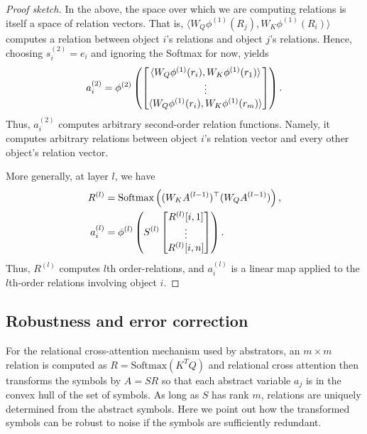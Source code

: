 \begin{proof}[Proof sketch]
	In the above, the space over which we are computing relations is itself a space of relation vectors. That is, \(\langle W_Q \phi^{(1)}(R_j), W_K \phi^{(1)}(R_i) \rangle\) computes a relation between object \(i\)'s relations and object \(j\)'s relations. Hence, choosing \(s_i^{(2)} = e_i\) and ignoring the Softmax for now, yields
	\begin{equation*}
		a_i^{(2)} = \phi^{(2)}\left(\begin{bmatrix}\langle W_Q \phi^{(1)}(r_i), W_K \phi^{(1)}(r_1) \rangle \\ \vdots \\ \langle W_Q \phi^{(1)}(r_i), W_K \phi^{(1)}(r_\m) \rangle\end{bmatrix}\right).
	\end{equation*}
	Thus, \(a_i^{(2)}\) computes arbitrary second-order relation functions. Namely, it computes arbitrary relations between object \(i\)'s relation vector and every other object's relation vector.

	More generally, at layer \(l\), we have
	\begin{align*}
		R^{(l)} &= \Softmax\left((W_K A^{(l-1)})^\top (W_Q A^{(l-1)})\right),\\
		a_i^{(l)} &= \phi^{(l)}\left(S^{(l)} \begin{bmatrix}R^{(l)}[i,1] \\ \vdots \\ R^{(l)}[i,n]\end{bmatrix}\right).
	\end{align*}
	Thus, \(R^{(l)}\) computes \(l\)th order-relations, and \(a_i^{(l)}\) is a linear map applied to the \(l\)th-order relations involving object \(i\).
\end{proof}


\subsection{Robustness and error correction}

For the relational cross-attention mechanism used by abstrators, an \(m\times m\) relation
is computed as  \(R = \mbox{Softmax}(K^T Q)\)
and relational cross attention then transforms the symbols by
\(A = SR\) so that each abstract variable \(a_j\) is in the convex hull of the set of symbols.
As long as \(S\) has rank \(m\), relations are uniquely determined from the abstract symbols.
Here we point out how the transformed symbols can be robust to noise if the symbols are
sufficiently redundant.

